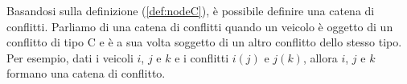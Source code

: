 \documentclass[../../../relazione.tex]{subfiles}
\begin{document}
Basandosi sulla definizione (\ref{def:nodeC}), è possibile definire una catena di conflitti.
Parliamo di una catena di conflitti quando un veicolo è oggetto di un conflitto di tipo C e è a sua volta soggetto di un altro conflitto dello stesso tipo.
Per esempio, dati i veicoli $i$, $j$ e $k$ e i conflitti $i(j)$ e $j(k)$, allora $i$, $j$ e $k$ formano una catena di conflitto.
\end{document}
